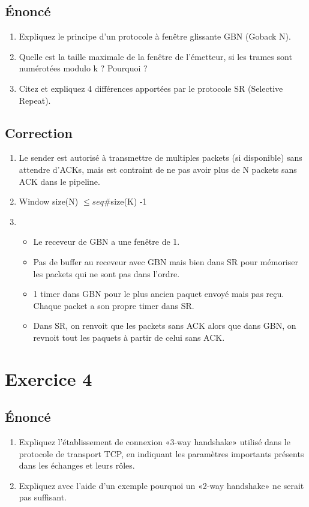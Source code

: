 \documentclass[a4paper, 11pt, titlepage]{article}
\begin{document}
\subsection{\'Enoncé}
\begin{enumerate}[label=(\alph*)]
\item Expliquez le principe d’un protocole à fenêtre glissante GBN (Goback N).
\item Quelle est la taille maximale de la fenêtre de l’émetteur, si les trames sont numérotées modulo k ? Pourquoi ?
\item Citez et expliquez 4 différences apportées par le protocole SR (Selective Repeat).
\end{enumerate}

\subsection{Correction}
\begin{enumerate}[label=(\alph*)]
\item
Le sender est autorisé à transmettre de multiples packets (si disponible) sans attendre d'ACKs, mais est contraint de ne pas avoir plus de N packets sans ACK dans le pipeline.

\item 
Window size(N) $\leq seq\# $size(K) -1 

\item  
\begin{itemize}
\item Le receveur de GBN a une fenêtre de 1.
\item Pas de buffer au receveur avec GBN mais bien dans SR pour mémoriser les packets qui ne sont pas dans l'ordre.
\item 1 timer dans GBN pour le plus ancien paquet envoyé mais pas reçu. Chaque packet a son propre timer dans SR.
\item Dans SR, on renvoit que les packets sans ACK alors que dans GBN, on revnoit tout les paquets à partir de celui sans ACK.
\end{itemize}

\end{enumerate}



\section{Exercice 4}
\subsection{\'Enoncé}
\begin{enumerate}[label=(\alph*)]
\item Expliquez l’établissement de connexion «3-way handshake» utilisé dans le protocole de transport TCP, en indiquant les paramètres importants présents dans les échanges et leurs rôles.
\item Expliquez avec l’aide d’un exemple pourquoi un «2-way handshake» ne serait pas suffisant.
\end{enumerate}
\end{document}
